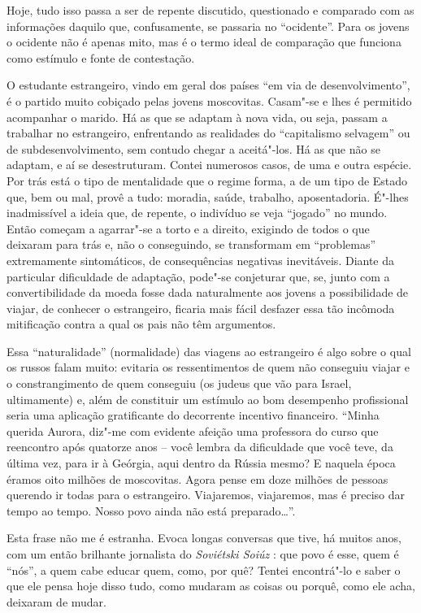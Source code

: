 Hoje, tudo isso passa a ser de repente discutido, questionado e
comparado com as informações daquilo que, confusamente, se passaria no
``ocidente''. Para os jovens o ocidente não é apenas mito, mas é o termo
ideal de comparação que funciona como estímulo e fonte de contestação.

O estudante estrangeiro, vindo em geral dos países ``em via de
desenvolvimento'', é o partido muito cobiçado pelas jovens moscovitas.
Casam"-se e lhes é permitido acompanhar o marido. Há as que se adaptam à
nova vida, ou seja, passam a trabalhar no estrangeiro, enfrentando as
realidades do ``capitalismo selvagem'' ou de subdesenvolvimento, sem
contudo chegar a aceitá"-los. Há as que não se adaptam, e aí se
desestruturam. Contei numerosos casos, de uma e outra espécie. Por trás
está o tipo de mentalidade que o regime forma, a de um tipo de Estado
que, bem ou mal, provê a tudo: moradia, saúde, trabalho, aposentadoria.
É"-lhes inadmissível a ideia que, de repente, o indivíduo se veja
``jogado'' no mundo. Então começam a agarrar"-se a torto e a direito,
exigindo de todos o que deixaram para trás e, não o conseguindo, se
transformam em ``problemas'' extremamente sintomáticos, de consequências
negativas inevitáveis. Diante da particular dificuldade de adaptação,
pode"-se conjeturar que, se, junto com a convertibilidade da moeda fosse
dada naturalmente aos jovens a possibilidade de viajar, de conhecer o
estrangeiro, ficaria mais fácil desfazer essa tão incômoda mitificação
contra a qual os pais não têm argumentos.

Essa ``naturalidade'' (normalidade) das viagens ao estrangeiro é algo
sobre o qual os russos falam muito: evitaria os ressentimentos de quem
não conseguiu viajar e o constrangimento de quem conseguiu (os judeus
que vão para Israel, ultimamente) e, além de constituir um estímulo ao
bom desempenho profissional seria uma aplicação gratificante do
decorrente incentivo financeiro. ``Minha querida Aurora, diz"-me com
evidente afeição uma professora do curso que reencontro após quatorze
anos -- você lembra da dificuldade que você teve, da última vez, para ir
à Geórgia, aqui dentro da Rússia mesmo? E naquela época éramos oito
milhões de moscovitas. Agora pense em doze milhões de pessoas querendo
ir todas para o estrangeiro. Viajaremos, viajaremos, mas é preciso dar
tempo ao tempo. Nosso povo ainda não está preparado\ldots{}''.

Esta frase não me é estranha. Evoca longas conversas que tive, há muitos
anos, com um então brilhante jornalista do \emph{Soviétski Soiúz} : que
povo é esse, quem é ``nós'', a quem cabe educar quem, como, por quê?
Tentei encontrá"-lo e saber o que ele pensa hoje disso tudo, como mudaram
as coisas ou porquê, como ele acha, deixaram de mudar.

